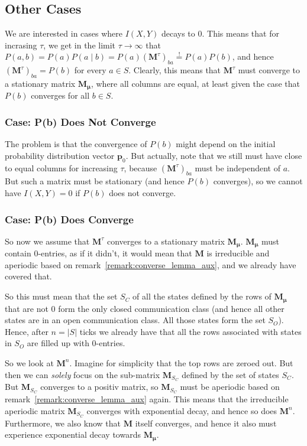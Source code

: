 \documentclass[../../main.tex]{subfiles}
\begin{document}
\subsection{Other Cases}
    We are interested in cases where $I(X, Y)$ decays to $0$. This means that for incrasing $\tau$, we get in the limit $\tau \to \infty$ that $P(a, b) = P(a) P(a \mid b) = P(a) (\bm{M}^\tau)_{ba} \overset{!}{=} P(a) P(b)$, and hence $(\bm{M}^\tau)_{ba} = P(b)$ for every $a \in S$. Clearly, this means that $\bm{M}^\tau$ must converge to a stationary matrix $\bm{M_\mu}$, where all columns are equal, at least given the case that $P(b)$ converges for all $b \in S$.

\subsubsection{Case: P(b) Does Not Converge}
    The problem is that the convergence of $P(b)$ might depend on the initial probability distribution vector $\bm{p}_0$. But actually, note that we still must have close to equal columns for increasing $\tau$, because $(\bm{M}^\tau)_{ba}$ must be independent of $a$. But such a matrix must be stationary (and hence $P(b)$ converges), so we cannot have $I(X, Y) = 0$ if $P(b)$ does not converge.

\subsubsection{Case: P(b) Does Converge}
    So now we assume that $\bm{M}^\tau$ converges to a stationary matrix $\bm{M_\mu}$. $\bm{M_\mu}$ must contain 0-entries, as if it didn't, it would mean that $\bm{M}$ is irreducible and aperiodic based on remark~\ref{remark:converse_lemma_aux}, and we already have covered that.

    So this must mean that the set $S_C$ of all the states defined by the rows of $\bm{M_\mu}$ that are not 0 form the only closed communication class (and hence all other states are in an open communication class. All those states form the set $S_O$). Hence, after $n = |S|$ ticks we already have that all the rows associated with states in $S_O$ are filled up with 0-entries.

    So we look at $\bm{M}^n$. Imagine for simplicity that the top rows are zeroed out. But then we can \emph{solely} focus on the sub-matrix $\bm{M}_{S_C}$ defined by the set of states $S_C$. But $\bm{M}_{S_C}$ converges to a positiv matrix, so $\bm{M}_{S_C}$ must be aperiodic based on remark~\ref{remark:converse_lemma_aux} again. This means that the irreducible aperiodic matrix $\bm{M}_{S_C}$ converges with exponential decay, and hence so does $\bm{M}^n$. Furthermore, we also know that $\bm{M}$ itself converges, and hence it also must experience exponential decay towards $\bm{M_\mu}$.
\end{document}
